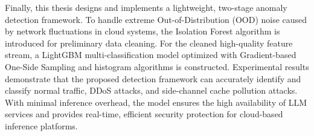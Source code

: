 \documentclass[master, vlined]{DissertUESTC}
\begin{document}
	Finally, this thesis designs and implements a lightweight, two-stage anomaly detection framework. To handle extreme Out-of-Distribution (OOD) noise caused by network fluctuations in cloud systems, the Isolation Forest algorithm is introduced for preliminary data cleaning. For the cleaned high-quality feature stream, a LightGBM multi-classification model optimized with Gradient-based One-Side Sampling and histogram algorithms is constructed. Experimental results demonstrate that the proposed detection framework can accurately identify and classify normal traffic, DDoS attacks, and side-channel cache pollution attacks. With minimal inference overhead, the model ensures the high availability of LLM services and provides real-time, efficient security protection for cloud-based inference platforms.


	
	\tableofcontents  %
	
	
	
	
	
	
	\printnomenclature
	
\end{document}
